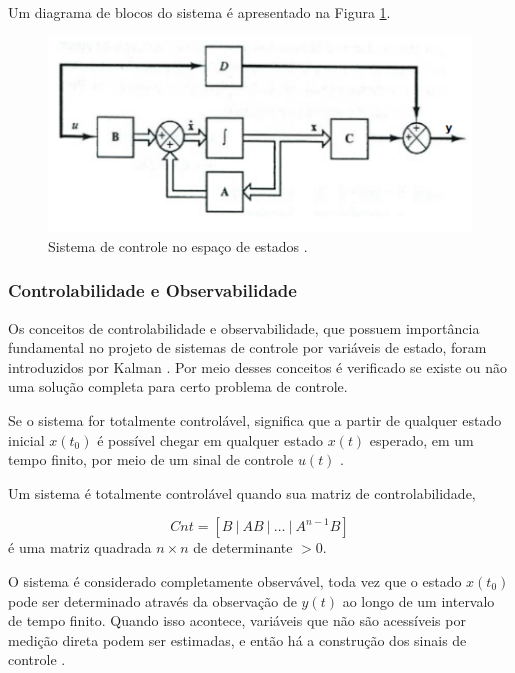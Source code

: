 \documentclass[journal,brazil,english]{IEEEtran}
\begin{document}
Um diagrama de blocos do sistema é apresentado na Figura \ref{diagrama1}.
\begin{figure}[H]
	\centering
	\includegraphics[width=\columnwidth]{./imagens/diagrama1.pdf}
	\renewcommand{\figurename}{Fig.}
    \caption{Sistema de controle no espaço de estados \cite{ogata}.}
	\label{diagrama1}
\end{figure}

\subsubsection{Controlabilidade e Observabilidade}\label{ceo}
Os conceitos de controlabilidade e observabilidade, que possuem importância fundamental no projeto de sistemas de controle por variáveis de estado, foram introduzidos por Kalman \cite{ogata}. Por meio desses conceitos é verificado se existe ou não uma solução completa para certo problema de controle.

Se o sistema for totalmente controlável, significa que a partir de qualquer estado inicial $x(t_0)$ é possível chegar em qualquer estado $x(t)$ esperado, em um tempo finito, por meio de um sinal de controle $u(t)$ \cite{dorf}.

Um sistema é totalmente controlável quando sua matriz de controlabilidade,

\begin{equation}
Cnt=\left[B~|~AB~|~\ldots~|~A^{n-1}B\right]
\end{equation}
é uma matriz quadrada $n\times n$ de determinante $>0$.

O sistema é considerado completamente observável, toda vez que o estado $x(t_0)$ pode ser determinado através da observação de $y(t)$ ao longo de um intervalo de tempo finito. Quando isso acontece, variáveis que não são acessíveis por medição direta podem ser estimadas, e então há a construção dos sinais de controle \cite{ogata}.
\end{document}
